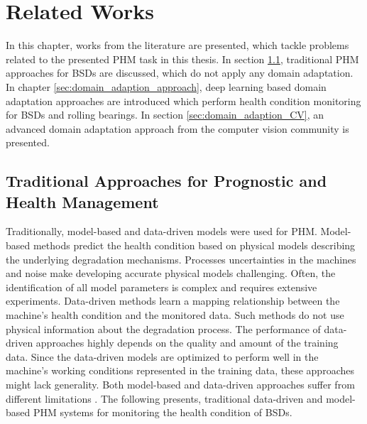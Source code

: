 
\chapter{Related Works}\label{chapter:related_works}
In this chapter, works from the literature are presented, which tackle problems related to the presented PHM task in this thesis. In section \ref{sec:traditional_approaches}, traditional PHM approaches for BSDs are discussed, which do not apply any domain adaptation. In chapter \ref{sec:domain_adaption_approach}, deep learning based domain adaptation approaches are introduced which perform health condition monitoring for BSDs and rolling bearings. In section \ref{sec:domain_adaption_CV}, an advanced domain adaptation approach from the computer vision community is presented. 

\section{Traditional Approaches for Prognostic and Health Management}\label{sec:traditional_approaches}

Traditionally, model-based and data-driven models were used for PHM. Model-based methods predict the health condition based on physical models describing the underlying degradation mechanisms. Processes uncertainties in the machines and noise make developing accurate physical models challenging. Often, the identification of all model parameters is complex and requires extensive experiments. Data-driven methods learn a mapping relationship between the machine's health condition and the monitored data. Such methods do not use physical information about the degradation process. The performance of data-driven approaches highly depends on the quality and amount of the training data. Since the data-driven models are optimized to perform well in the machine's working conditions represented in the training data, these approaches might lack generality. Both model-based and data-driven approaches suffer from different limitations \cite{DENG2020}. The following presents, traditional data-driven and model-based PHM systems for monitoring the health condition of BSDs.

